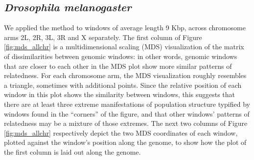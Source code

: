 \documentclass[11pt, oneside]{article}   	%
\begin{document}
\subsection{\textit{Drosophila melanogaster}}

We applied the method to windows of average length 9 Kbp, across chromosome arms 2L, 2R, 3L, 3R and X separately.
The first column of Figure \ref{fig:mds_allchr} is a multidimensional scaling (MDS) visualization 
of the matrix of dissimilarities between genomic windows:
in other words, genomic windows that are closer to each other in the MDS plot show more similar patterns of relatedness.
For each chromosome arm, the MDS visualization roughly resembles a triangle,
sometimes with additional points.
Since the relative position of each window in this plot shows the similarity between windows, 
this suggests that there are at least three extreme manifestations of population structure 
typified by windows found in the ``corners'' of the figure,
and that other windows' patterns of relatedness may be a mixture of those extremes. 
The next two columns of Figure \ref{fig:mds_allchr} respectively depict the two MDS coordinates of each window,
plotted against the window's position along the genome,
to show how the plot of the first column is laid out along the genome.
\end{document}
